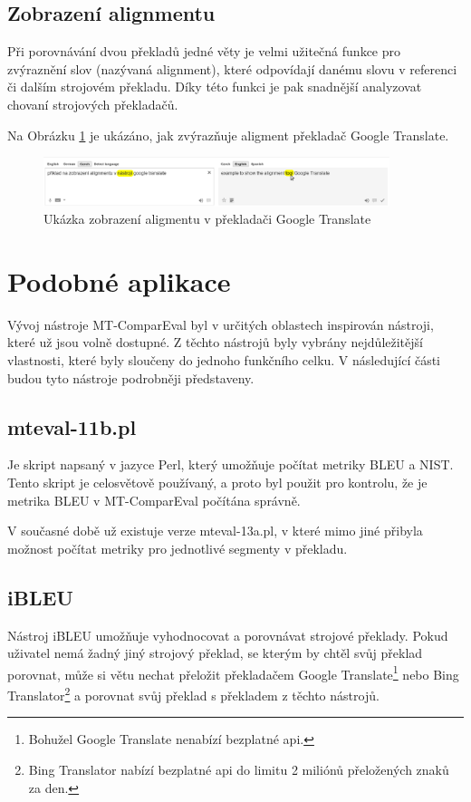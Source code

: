 \subsection{Zobrazení alignmentu}
Při porovnávání dvou překladů jedné věty je velmi užitečná funkce pro zvýraznění slov (nazývaná alignment),
  které odpovídají danému slovu v referenci či dalším strojovém překladu.
Díky této funkci je pak snadnější analyzovat chovaní strojových překladačů.

Na Obrázku \ref{img:alignment} je ukázáno, jak zvýrazňuje aligment překladač Google Translate.
\begin{figure}
	\center
	\includegraphics[width=0.9\textwidth]{img/alignment.eps}
	\caption{Ukázka zobrazení aligmentu v překladači Google Translate}
	\label{img:alignment}
\end{figure}

\section{Podobné aplikace}
Vývoj nástroje MT-ComparEval byl v určitých oblastech inspirován nástroji,
  které už jsou volně dostupné.
Z těchto nástrojů byly vybrány nejdůležitější vlastnosti,
  které byly sloučeny do jednoho funkčního celku.
V následující části budou tyto nástroje podrobněji představeny.

\subsection{mteval-11b.pl}
Je skript napsaný v jazyce Perl,
  který umožňuje počítat metriky BLEU a NIST.
Tento skript je celosvětově používaný,
  a proto byl použit pro kontrolu,
  že je metrika BLEU v MT-ComparEval počítána správně.

V současné době už existuje verze mteval-13a.pl,
  v které mimo jiné přibyla možnost počítat metriky pro jednotlivé segmenty v překladu.

\subsection{iBLEU}
Nástroj iBLEU umožňuje vyhodnocovat a porovnávat strojové překlady.
Pokud uživatel nemá žadný jiný strojový překlad,
  se kterým by chtěl svůj překlad porovnat,
  může si větu nechat přeložit překladačem Google Translate\footnote{
    Bohužel Google Translate nenabízí bezplatné api.
  } nebo Bing Translator\footnote{
    Bing Translator nabízí bezplatné api do limitu 2 miliónů přeložených znaků za den.
  }
  a porovnat svůj překlad s překladem z těchto nástrojů.

